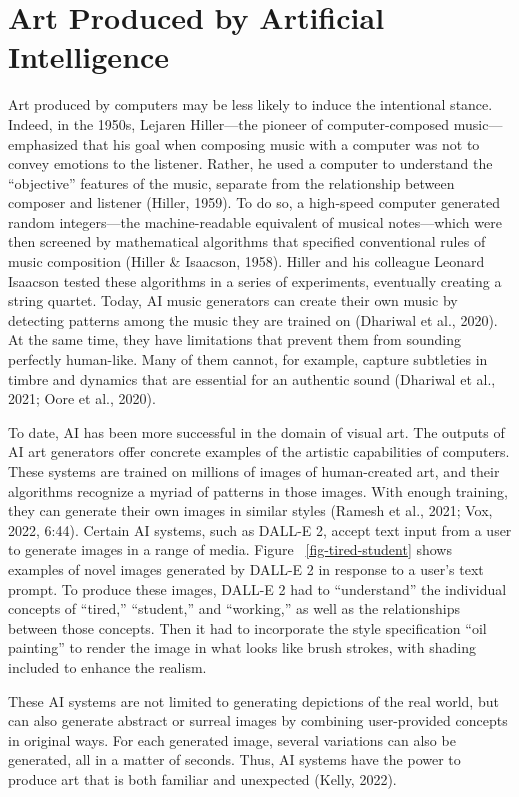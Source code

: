 \documentclass[12pt,twoside]{reedthesis}
\begin{document}
\section*{Art Produced by Artificial Intelligence
}
Art produced by computers may be less likely to induce the intentional stance. Indeed, in the 1950s, Lejaren Hiller—the pioneer of computer-composed music—emphasized that his goal when composing music with a computer was not to convey emotions to the listener. Rather, he used a computer to understand the “objective” features of the music, separate from the relationship between composer and listener (Hiller, 1959). To do so, a high-speed computer generated random integers—the machine-readable equivalent of musical notes—which were then screened by mathematical algorithms that specified conventional rules of music composition (Hiller \& Isaacson, 1958). Hiller and his colleague Leonard Isaacson tested these algorithms in a series of experiments, eventually creating a string quartet. Today, AI music generators can create their own music by detecting patterns among the music they are trained on (Dhariwal et al., 2020). At the same time, they have limitations that prevent them from sounding perfectly human-like. Many of them cannot, for example, capture subtleties in timbre and dynamics that are essential for an authentic sound (Dhariwal et al., 2021; Oore et al., 2020). 

To date, AI has been more successful in the domain of visual art. The outputs of AI art generators offer concrete examples of the artistic capabilities of computers. These systems are trained on millions of images of human-created art, and their algorithms recognize a myriad of patterns in those images. With enough training, they can generate their own images in similar styles (Ramesh et al., 2021; Vox, 2022, 6:44). Certain AI systems, such as DALL-E 2, accept text input from a user to generate images in a range of media. Figure ~\ref{fig-tired-student} shows examples of novel images generated by DALL-E 2 in response to a user’s text prompt. To produce these images, DALL-E 2 had to “understand” the individual concepts of “tired,” “student,” and “working,” as well as the relationships between those concepts. Then it had to incorporate the style specification “oil painting” to render the image in what looks like brush strokes, with shading included to enhance the realism. 

These AI systems are not limited to generating depictions of the real world, but can also generate abstract or surreal images by combining user-provided concepts in original ways. For each generated image, several variations can also be generated, all in a matter of seconds. Thus, AI systems have the power to produce art that is both familiar and unexpected (Kelly, 2022).
\end{document}
